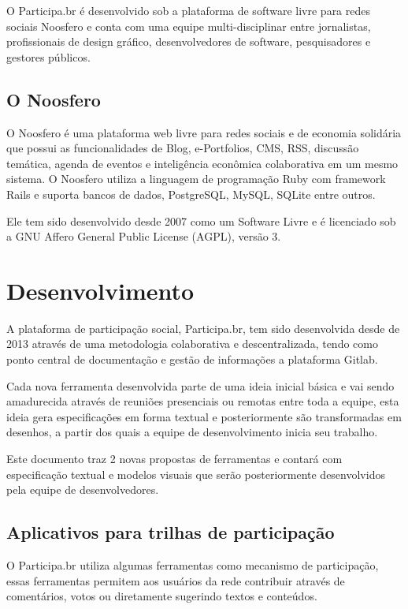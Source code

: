 \documentclass[12pt]{article}
\begin{document}
O Participa.br é desenvolvido sob a plataforma de software livre para redes
sociais Noosfero e conta com uma equipe multi-disciplinar entre jornalistas,
profissionais de design gráfico, desenvolvedores de software, pesquisadores e
gestores públicos.

\subsection{O Noosfero}

O Noosfero\cite{noosfero} é uma plataforma web livre para redes sociais e de
economia solidária que possui as funcionalidades de Blog, e-Portfolios,
CMS, RSS, discussão temática, agenda de eventos e
inteligência econômica colaborativa em um mesmo sistema. O Noosfero utiliza a
linguagem de programação Ruby com framework Rails
e suporta bancos de dados, PostgreSQL, MySQL, SQLite entre outros.

Ele tem sido desenvolvido desde 2007 como um Software Livre e é licenciado sob
a GNU Affero General Public License (AGPL), versão 3.

\section{Desenvolvimento}

A plataforma de participação social, Participa.br, tem sido desenvolvida desde
de 2013 através de uma metodologia colaborativa e descentralizada, tendo como
ponto central de documentação e gestão de informações a plataforma
Gitlab\cite{gitlab}.

Cada nova ferramenta desenvolvida parte de uma ideia inicial básica e vai
sendo amadurecida através de reuniões presenciais ou remotas entre toda a
equipe, esta ideia gera especificações em forma textual e posteriormente são
transformadas em desenhos, a partir dos quais a equipe de desenvolvimento
inicia seu trabalho.

Este documento traz 2 novas propostas de ferramentas e contará com
especificação textual e modelos visuais que serão posteriormente desenvolvidos
pela equipe de desenvolvedores.

\subsection{Aplicativos para trilhas de participação}
 
O Participa.br utiliza algumas ferramentas como mecanismo de participação,
essas ferramentas permitem aos usuários da rede contribuir através de
comentários, votos ou diretamente sugerindo textos e conteúdos.
\end{document}
